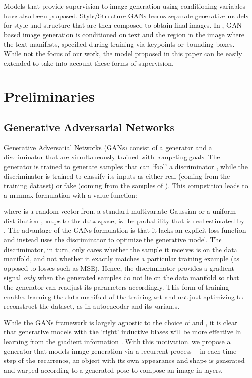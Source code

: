 \documentclass{article} \usepackage{iclr2017_conference,times}
\begin{document}
Models that provide supervision to image generation using conditioning variables have also been proposed: Style/Structure GANs \citep{StyleGAN} learns separate generative models for style and structure that are then composed to obtain final images. In \cite{WWGAN}, GAN based image generation is conditioned on text and the region in the image where the text manifests, specified during training via keypoints or bounding boxes. While not the focus of our work, the model proposed in this paper can be easily extended to take into account these forms of supervision.
%
 






\section{Preliminaries}

\subsection{Generative Adversarial Networks }
\label{sec:gan}
Generative Adversarial Networks (GANs) consist of a generator  and a discriminator  that 
are simultaneously trained with competing goals: The generator  is trained to generate samples that can `fool' a discriminator , while the discriminator is trained to classify its inputs as either real (coming from the training dataset) or fake (coming from the samples of ). This competition leads to a minmax formulation with a value function:

where  is a random vector from a standard multivariate Gaussian or a uniform distribution ,  maps  to the data space,  is the probability that  is real estimated by . The advantage of the GANs formulation is that it lacks an explicit loss function and instead uses the discriminator to optimize the generative model. The discriminator, in turn, only cares whether the sample it receives is on the data manifold, and not whether it exactly matches a particular training example (as opposed to losses such as MSE). Hence, the discriminator provides a gradient signal \emph{only} when the generated samples do not lie on the data manifold so that the generator can readjust its parameters accordingly. This form of training enables learning the data manifold of the training set and not just optimizing to reconstruct the dataset, as in autoencoder and its variants.


While the GANs framework is largely agnostic to the choice of  and , it is clear that generative models with the `right' inductive biases will be more effective in learning from the gradient information \citep{LAPGAN,GRAN,GDG+15,WWGAN,YanYSL15}. With this motivation, we propose a generator that models image generation via a recurrent process -- in each time step of the recurrence, an object with its own appearance and shape is generated and warped according to a generated pose to compose an image in layers.
\end{document}
